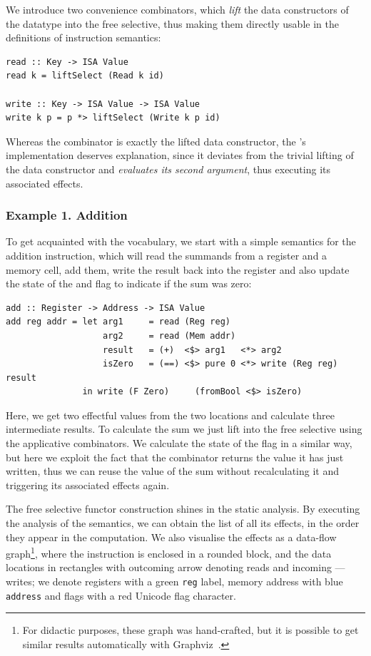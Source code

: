 We introduce two convenience combinators, which \emph{lift} the data constructors
of the  datatype into the free selective, thus making them directly usable in
the definitions of instruction semantics:

\begin{verbatim}
read :: Key -> ISA Value
read k = liftSelect (Read k id)

write :: Key -> ISA Value -> ISA Value
write k p = p *> liftSelect (Write k p id)
\end{verbatim}

Whereas the  combinator is exactly the lifted  data constructor,
the 's implementation deserves explanation, since it deviates from the trivial
lifting of the  data constructor and \emph{evaluates its second argument},
thus executing its associated effects.

\subsubsection{\textbf{Example 1. Addition}}

To get acquainted with the vocabulary, we start with a simple semantics for
the addition instruction, which will read the summands from a register and a memory cell,
add them, write the result back into the register and also update the state of the 
and flag to indicate if the sum was zero:

\begin{verbatim}
add :: Register -> Address -> ISA Value
add reg addr = let arg1     = read (Reg reg)
                   arg2     = read (Mem addr)
                   result   = (+)  <$> arg1   <*> arg2
                   isZero   = (==) <$> pure 0 <*> write (Reg reg) result
               in write (F Zero)     (fromBool <$> isZero)
\end{verbatim}

Here, we get two effectful values from the two locations and calculate three intermediate
results. To calculate the sum we just lift \hs{+} into the free selective using the applicative
combinators. We calculate the state of the  flag in a similar way, but here we
exploit the fact that the  combinator returns the value it has just written, thus we
can reuse the value of the sum without recalculating it and triggering its associated effects
again.

The free selective functor construction shines in the static analysis. By executing
the analysis of the  semantics, we can obtain the list of all its effects,
in the order they appear in the computation. We also visualise the effects as a data-flow
graph\footnote{For didactic purposes,
these graph was hand-crafted, but it is possible to get similar results automatically
with Graphviz~\cite{ellson2001graphviz}.}, where the instruction is enclosed in a rounded block,
and the data locations in rectangles with outcoming arrow denoting reads and incoming --- writes; we denote registers with a green \texttt{reg} label, memory address with blue \texttt{address} and
flags with a red Unicode flag character.

